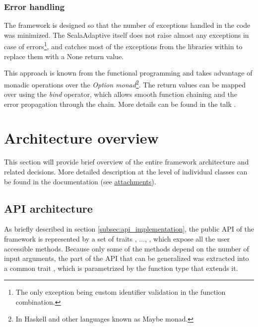 \subsubsection{Error handling}

The framework is designed so that the number of exceptions handled in the code was minimized. The ScalaAdaptive itself does not raise almost any exceptions in case of errors\footnote{The only exception being custom identifier validation in the function combination.}, and catches most of the exceptions from the libraries within to replace them with a None return value.

This approach is known from the functional programming and takes advantage of monadic operations over the \textit{Option monad}\footnote{In Haskell and other languages known as Maybe monad.}. The return values can be mapped over using the \textit{bind} operator, which allows smooth function chaining and the error propagation through the chain. More details can be found in the talk \cite{noauthor_railway_nodate}.

\section{Architecture overview}
\label{sec:architecture_overview}

This section will provide brief overview of the entire framework architecture and related decisions. More detailed description at the level of individual classes can be found in the documentation (see  \hyperref[attach:scaladoc]{attachments}).

\subsection{API architecture}
\label{subsec:api_architecture}

As briefly described in section \ref{subsec:api_implementation}, the public API of the framework is represented by a set of traits , ..., , which expose all the user accessible methods. Because only some of the methods depend on the number of input arguments, the part of the API that can be generalized was extracted into a common trait , which is parametrized by the function type that extends it. 

